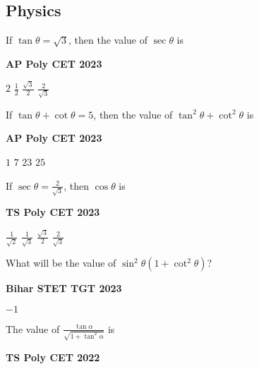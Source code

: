 \documentclass[11pt,paper=a4,answers]{exam}
\begin{document}
\subsection*{Physics}
\begin{multicols}{2}
\begin{questions}
\question
If $\tan  \theta = \sqrt{3}$, then the value of $\sec \theta$ is
\begin{flushright}
\small\textbf{AP Poly CET 2023}
\end{flushright}


\begin{choices}
\choice $\displaystyle 2$ 
\choice $\displaystyle \frac{1}{2}$ 
\choice $\displaystyle \frac{\sqrt{3}}{2}$ 
\choice $\displaystyle \frac{2}{\sqrt{3}}$  
\end{choices}






\question If $\tan  \theta + \cot \theta = 5$, then the value of $\tan^2  \theta + \cot^2 \theta $ is
\begin{flushright}
\small\textbf{AP Poly CET 2023}
\end{flushright}

\begin{choices}
\choice $\displaystyle 1$ 
\choice $\displaystyle 7$ 
\choice $\displaystyle 23$ 
\choice $\displaystyle 25$  
\end{choices}
\question If $\displaystyle \sec  \theta = \frac{2}{\sqrt{3}}$, then $\cos \theta$ is
\begin{flushright}
\small\textbf{TS Poly CET 2023}
\end{flushright}


\begin{choices}
\choice $\displaystyle \frac{1}{\sqrt{2}}$ 
\choice $\displaystyle \frac{1}{\sqrt{3}}$ 
\choice $\displaystyle \frac{\sqrt{3}}{2}$ 
\choice $\displaystyle \frac{2}{\sqrt{3}}$   
\end{choices}


\columnbreak
\question What will be the value of  $\sin^2 \theta \left(1+\cot^2 \theta \right)$?

\begin{flushright}
\small\textbf{Bihar STET TGT 2023}
\end{flushright}


\begin{choices}
\choice $-1$
\end{choices}
\question The value of $\displaystyle \frac{\tan \alpha}{\sqrt{1+ \tan^2 \alpha} }  $ is
\begin{flushright}
\small\textbf{TS Poly CET 2022}
\end{flushright}



\end{questions}
\end{multicols}
\end{document}
